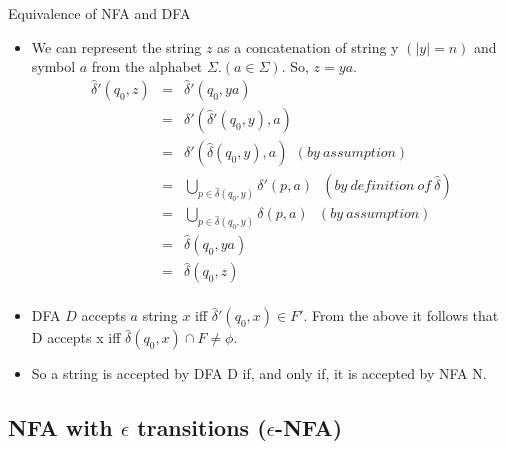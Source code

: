 \documentclass{beamer}
\begin{document}
\begin{frame}{Equivalence of NFA and DFA}
\begin{itemize}
	
	\item We can represent the string $z$ as a concatenation of string y $(|y| = n)$ and symbol $a$ from the alphabet $\Sigma. (a \in \Sigma).$ So, $z = ya$.
	\small
	\begin{eqnarray*}
		 \hat\delta'(q_0,z) &=& \hat\delta'(q_0, ya)\\
		 					&=& \delta'(\hat\delta'(q_0, y),a)\\
		 					&=& \delta'(\hat\delta(q_0, y),a)  \ \ (by \ assumption)\\
		 					&=& \bigcup\limits_{p\in\hat{\delta}(q_0,y)}\delta'(p,a)\ \  \  (by\ definition \ of \  \hat{\delta}) \\
		 					&=& \bigcup\limits_{p\in\hat{\delta}(q_0,y)}\delta(p,a)\ \  \  (by \ assumption) \\
		 					&=&\hat{\delta}(q_0,ya) \\
		 					&=&\hat{\delta}(q_0,z)\\
	\end{eqnarray*}
	\item DFA $D$ accepts $a$ string $x$ iff $\hat\delta'(q_0, x) \in F'.$ From the above it follows that D accepts x iff  $\hat\delta(q_0, x) \cap F \neq \phi$.
	\item So a string is accepted by DFA D if, and only if, it is accepted by NFA N.
\end{itemize}
\end{frame}

\subsection{NFA with $\epsilon$ transitions ($\epsilon$-NFA)}
\end{document}
